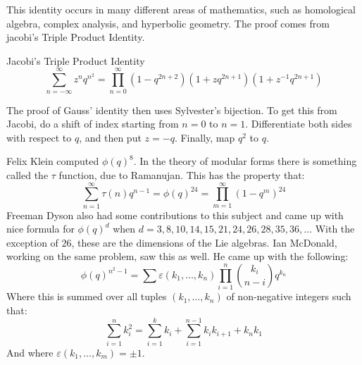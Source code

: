 \documentclass[crop=false,class=book,oneside]{standalone}
\begin{document}
        This identity occurs in many different areas of mathematics,
        such as homological algebra, complex analysis, and
        hyperbolic geometry. The proof comes from jacobi's
        Triple Product Identity.
        \begin{ltheorem}{Jacobi's Triple Product Identity}
            \begin{equation}
                \sum_{n=\minus\infty}^{\infty}z^{n}q^{n^{2}}=
                    \prod_{n=0}^{\infty}(1-q^{2n+2})
                        (1+zq^{2n+1})(1+z^{\minus{1}}q^{2n+1})
            \end{equation}
        \end{ltheorem}
        The proof of Gauss' identity then uses Sylvester's
        bijection. To get this from Jacobi, do a shift of
        index starting from $n=0$ to $n=1$. Differentiate both
        sides with respect to $q$, and then put
        $z=\minus{q}$. Finally, map $q^{2}$ to $q$.
        \par\hfill\par
        Felix Klein computed $\phi(q)^{8}$. In the theory of
        modular forms there is something called the $\tau$
        function, due to Ramanujan. This has the property that:
        \begin{equation}
            \sum_{n=1}^{\infty}\tau(n)q^{n-1}=
            \phi(q)^{24}=\prod_{m=1}^{\infty}(1-q^{m})^{24}
        \end{equation}
        Freeman Dyson also had some contributions to this subject
        and came up with nice formula for $\phi(q)^{d}$ when
        $d=3,8,10,14,15,21,24,26,28,35,36,\dots$ With the
        exception of $26$, these are the dimensions of the Lie
        algebras. Ian McDonald, working on the same problem, saw
        this as well. He came up with the following:
        \begin{equation}
            \phi(q)^{n^{2}-1}=\sum\varepsilon(k_{1},\dots,k_{n})
                \prod_{i=1}^{n}\binom{k_{i}}{n-i}q^{k_{n}}
        \end{equation}
        Where this is summed over all tuples $(k_{1},\dots,k_{n})$
        of non-negative integers such that:
        \begin{equation}
            \sum_{i=1}^{n}k_{i}^{2}=\sum_{i=1}^{k}k_{i}+
            \sum_{i=1}^{n-1}k_{i}k_{i+1}
            +k_{n}k_{1}
        \end{equation}
        And where $\varepsilon(k_{1},\dots,k_{m})=\pm{1}$.
\end{document}
